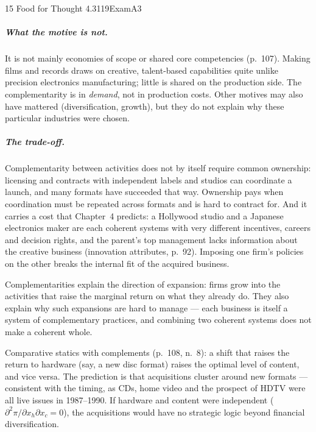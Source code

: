 \begin{exsol}{15}{\MR{} Food for Thought 4.3}{119}{Exam}{A3}
\subparagraph{What the motive is not.} It is not mainly economies of scope or shared core
competencies (p.~107). Making films and records draws on creative, talent-based capabilities quite
unlike precision electronics manufacturing; little is shared on the production side. The
complementarity is in \emph{demand}, not in production costs. Other motives may also have
mattered (diversification, growth), but they do not explain why these particular industries were
chosen.

\subparagraph{The trade-off.} Complementarity between activities does not by itself require
common ownership: licensing and contracts with independent labels and studios can coordinate a
launch, and many formats have succeeded that way. Ownership pays when coordination must be
repeated across formats and is hard to contract for. And it carries a cost that Chapter~4
predicts: a Hollywood studio and a Japanese electronics maker are each coherent systems with very
different incentives, careers and decision rights, and the parent's top management lacks
information about the creative business (innovation attributes, p.~92). Imposing one firm's
policies on the other breaks the internal fit of the acquired business.

\interp Complementarities explain the direction of expansion: firms grow into the activities that
raise the marginal return on what they already do. They also explain why such expansions are hard
to manage --- each business is itself a system of complementary practices, and combining two
coherent systems does not make a coherent whole.

\verify Comparative statics with complements (p.~108, n.~8): a shift that raises the return to
hardware (say, a new disc format) raises the optimal level of content, and vice versa. The
prediction is that acquisitions cluster around new formats --- consistent with the timing, as CDs,
home video and the prospect of HDTV were all live issues in 1987--1990. If hardware and content
were independent ($\partial^2\pi/\partial x_h\partial x_c=0$), the acquisitions would have no
strategic logic beyond financial diversification.

\end{exsol}
